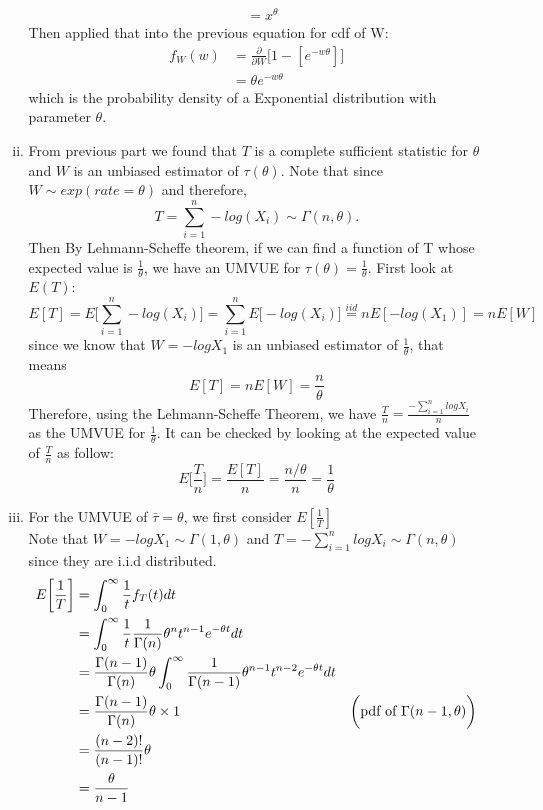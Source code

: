 \documentclass[a4paper,11pt]{article}
\begin{document}
\begin{enumerate}[(a)]
\begin{enumerate}[(i)]
\begin{align*}
			&= x^\theta
			\end{align*}
			Then applied that into the previous equation for cdf of W:
			\begin{align*}
			f_W(w)&=\frac{\partial}{\partial W}\bigg[1-[e^{-w\theta}] \bigg] \\
			&= \theta e^{-w\theta}
			\end{align*}			
			which is the probability density of a Exponential distribution with parameter $\theta$.
		\item
			From previous part we found that $T$ is a complete sufficient statistic for $\theta$ and $W$ is an unbiased estimator of $\tau(\theta)$. 
			Note that since $W\sim exp(rate = \theta)$ and therefore,
			\[
			T= \sum^n_{i=1} -log(X_i) \sim \Gamma(n,\theta).
			\]
			Then By Lehmann-Scheffe theorem, if we can find a function of T whose expected value is $\frac{1}{\theta}$, we have an UMVUE for $\tau(\theta)=\frac{1}{\theta}$.
			First look at $E(T)$:
			\[
			E[T] = E\bigg[ \sum^n_{i=1} -log(X_i) \bigg] =  \sum^n_{i=1} E\bigg[-log(X_i) \bigg] \stackrel{iid}{=} nE[-log(X_1)]=nE[W]
			\]
			since we know that $W = -log X_1$ is an unbiased estimator of $\frac{1}{\theta}$, that means
			\[
			E[T] = nE[W] = \frac{n}{\theta}
			\]
			Therefore, using the Lehmann-Scheffe Theorem, we have $\frac{T}{n}=\frac{-\sum^n_{i=1} logX_i}{n}$ as the UMVUE for $\frac{1}{\theta}$. It can be checked by looking at the expected value of $\frac{T}{n}$ as follow:
			\[
			E\bigg[\frac{T}{n}\bigg] =\frac{E[T]}{n}=\frac{n/\theta}{n}=\frac{1}{\theta}
			\]
		\item
			For the UMVUE of $\bar{\tau} = \theta$, we first consider $E[ \frac{1}{T}]$
			\\Note that $W = -logX_1 \sim \Gamma(1,\theta)$ and $T = -\sum^n_{i=1} logX_i \sim \Gamma(n,\theta)$ since they are i.i.d distributed.
			\begin{align*}
			E\bigg[ \frac{1}{T} \bigg] &= \int^\infty_0  \frac{1}{t}  f_T(t) dt \\
			&= \int^\infty_0 \frac{1}{t}  \frac{1}{\Gamma(n)}\theta^nt^{n-1}e^{-\theta t} dt\\
			&= \frac{\Gamma(n-1)}{\Gamma(n)} \theta \int^\infty_0 \frac{1}{\Gamma(n-1)}\theta^{n-1}t^{n-2}e^{-\theta t} dt\\
			&= \frac{\Gamma(n-1)}{\Gamma(n)} \theta \times 1 & \mbox{\bigg(pdf of $\Gamma(n-1,\theta)\bigg)$}\\
			&=\frac{(n-2)!}{(n-1)!}\theta\\
			&= \frac{\theta}{n-1}
			\end{align*}

\end{enumerate}
\end{enumerate}
\end{document}
